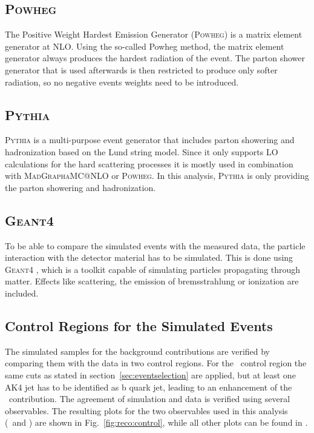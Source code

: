 \subsection*{\textsc{Powheg}}
The Positive Weight Hardest Emission Generator (\textsc{Powheg}) \cite{powheg1,powheg2,powheg3} is a matrix element generator at NLO. Using the so-called Powheg method, the matrix element generator always produces the hardest radiation of the event. The parton shower generator that is used afterwards is then restricted to produce only softer radiation, so no negative events weights need to be introduced.
\subsection*{\textsc{Pythia}}
\textsc{Pythia} \cite{pythia1,pythia2} is a multi-purpose event generator that includes parton showering and hadronization based on the Lund string model. Since it only supports LO calculations for the hard scattering processes it is mostly used in combination with \textsc{MadGraph\textunderscore aMC@NLO} or \textsc{Powheg}. In this analysis, \textsc{Pythia} is only providing the parton showering and hadronization.
\subsection*{\textsc{Geant4}}
To be able to compare the simulated events with the measured data, the particle interaction with the detector material has to be simulated. This is done using \textsc{Geant4} \cite{geant4}, which is a toolkit capable of simulating particles propagating through matter. Effects like scattering, the emission of bremsstrahlung or ionization are included.
\subsection*{Control Regions for the Simulated Events}
The simulated samples for the background contributions are verified by comparing them with the data in two control regions. For the \ttbar \ control region the same cuts as stated in section~\ref{sec:eventselection} are applied, but at least one AK4 jet has to be identified as b quark jet, leading to an enhancement of the \ttbar \ contribution. The agreement of simulation and data is verified using several observables. The resulting plots for the two observables used in this analysis (\Mpr \ and \MWV) are shown in Fig.~\ref{fig:reco:control}, while all other plots can be found in \cite{PAS}.\\

